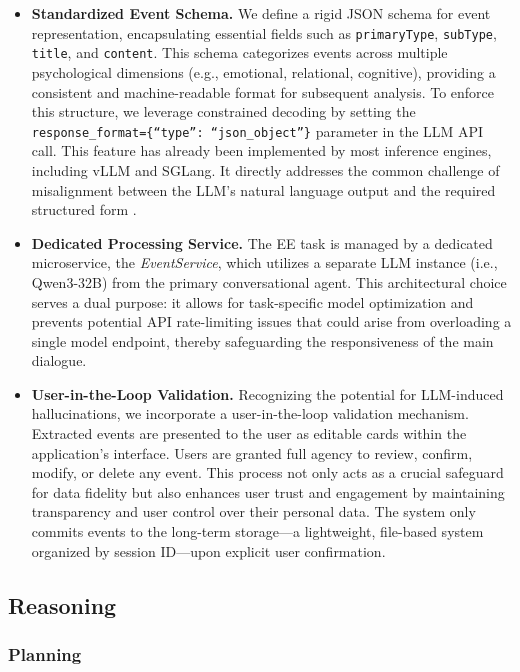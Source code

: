 \begin{itemize}
    \item \textbf{Standardized Event Schema.} We define a rigid JSON schema for event representation, encapsulating essential fields such as \texttt{primaryType}, \texttt{subType}, \texttt{title}, and \texttt{content}. This schema categorizes events across multiple psychological dimensions (e.g., emotional, relational, cognitive), providing a consistent and machine-readable format for subsequent analysis. To enforce this structure, we leverage constrained decoding by setting the \texttt{response\_format=\{``type'': ``json\_object''\}} parameter in the LLM API call. This feature has already been implemented by most inference engines, including vLLM and SGLang. It directly addresses the common challenge of misalignment between the LLM's natural language output and the required structured form \cite{xu2023large}.

    \item \textbf{Dedicated Processing Service.} The EE task is managed by a dedicated microservice, the \textit{EventService}, which utilizes a separate LLM instance (i.e., Qwen3-32B) from the primary conversational agent. This architectural choice serves a dual purpose: it allows for task-specific model optimization and prevents potential API rate-limiting issues that could arise from overloading a single model endpoint, thereby safeguarding the responsiveness of the main dialogue.

    \item \textbf{User-in-the-Loop Validation.} Recognizing the potential for LLM-induced hallucinations, we incorporate a user-in-the-loop validation mechanism. Extracted events are presented to the user as editable cards within the application's interface. Users are granted full agency to review, confirm, modify, or delete any event. This process not only acts as a crucial safeguard for data fidelity but also enhances user trust and engagement by maintaining transparency and user control over their personal data. The system only commits events to the long-term storage---a lightweight, file-based system organized by session ID---upon explicit user confirmation.
\end{itemize} 

\subsection{Reasoning}

\subsubsection{Planning}

